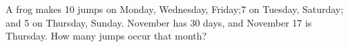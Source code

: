 A frog makes 10 jumps on Monday, Wednesday, Friday;7 on Tuesday, Saturday; and 5 on Thursday, Sunday. November has 30 days, and November 17 is Thursday. How many jumps occur that month?
